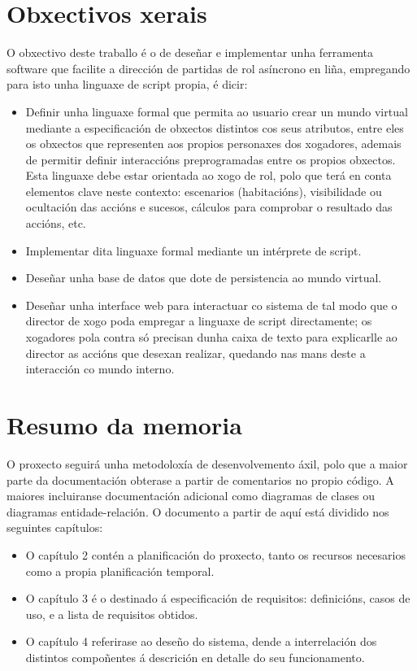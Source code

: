 \section{Obxectivos xerais}
O obxectivo deste traballo é o de deseñar e implementar unha ferramenta software
que facilite a dirección de partidas de rol asíncrono en liña, empregando para
isto unha linguaxe de script propia, é dicir:
\begin{itemize}
  \item Definir unha linguaxe formal que permita ao usuario crear un mundo virtual
  mediante a especificación de obxectos distintos cos seus atributos, entre eles
  os obxectos que representen aos propios personaxes dos xogadores, ademais de
  permitir definir interaccións preprogramadas entre os propios obxectos. Esta
  linguaxe debe estar orientada ao xogo de rol, polo que terá en conta elementos
  clave neste contexto: escenarios (habitacións), visibilidade ou ocultación das
  accións e sucesos, cálculos para comprobar o resultado das accións, etc.
  \item Implementar dita linguaxe formal mediante un intérprete de script.
  \item Deseñar unha base de datos que dote de persistencia ao mundo virtual.
  \item Deseñar unha interface web para interactuar co sistema de tal modo que o
  director de xogo poda empregar a linguaxe de script directamente; os
  xogadores pola contra só precisan dunha caixa de texto para explicarlle ao
  director as accións que desexan realizar, quedando nas mans deste a
  interacción co mundo interno.
\end{itemize}

\section{Resumo da memoria}
O proxecto seguirá unha metodoloxía de desenvolvemento áxil, polo que a maior
parte da documentación obterase a partir de comentarios no propio código. A
maiores incluiranse documentación adicional como diagramas de clases
ou diagramas entidade-relación. O documento a partir de aquí está dividido nos
seguintes capítulos:
\begin{itemize}
  \item O capítulo 2 contén a planificación do proxecto, tanto os recursos
  necesarios como a propia planificación temporal.
  \item O capítulo 3 é o destinado á especificación de requisitos:
  definicións, casos de uso, e a lista de requisitos obtidos.
  \item O capítulo 4 referirase ao deseño do sistema, dende a interrelación dos
  distintos compoñentes á descrición en detalle do seu funcionamento.
\end{itemize}